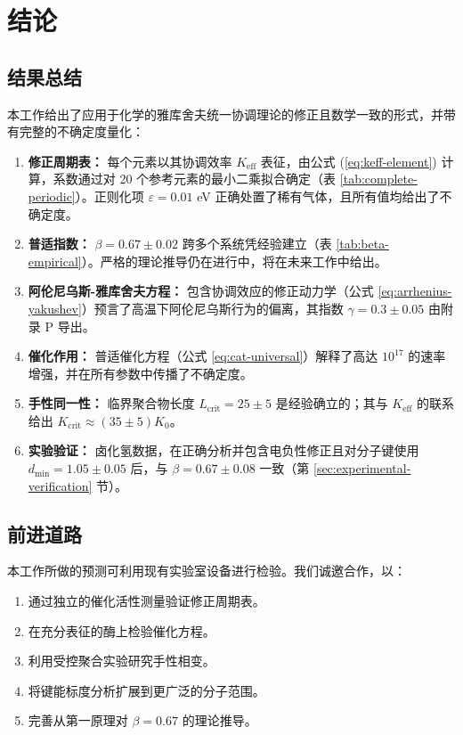 \documentclass[11pt,a4paper]{article}
\newcommand{\Keff}{K_{\mathrm{eff}}}
\newcommand{\Kcrit}{K_{\mathrm{crit}}}
\begin{document}
	\section{结论}
	\label{sec:conclusion}
	
	\subsection{结果总结}
	
	本工作给出了应用于化学的雅库舍夫统一协调理论的修正且数学一致的形式，并带有完整的不确定度量化：
	
	\begin{enumerate}
		\item \textbf{修正周期表：} 每个元素以其协调效率 \(\Keff\) 表征，由公式 (\ref{eq:keff-element}) 计算，系数通过对 20 个参考元素的最小二乘拟合确定（表 \ref{tab:complete-periodic}）。正则化项 \(\varepsilon = 0.01\) eV 正确处置了稀有气体，且所有值均给出了不确定度。
		
		\item \textbf{普适指数：} \(\beta = 0.67 \pm 0.02\) 跨多个系统凭经验建立（表 \ref{tab:beta-empirical}）。严格的理论推导仍在进行中，将在未来工作中给出。
		
		\item \textbf{阿伦尼乌斯-雅库舍夫方程：} 包含协调效应的修正动力学（公式 \ref{eq:arrhenius-yakushev}）预言了高温下阿伦尼乌斯行为的偏离，其指数 \(\gamma = 0.3 \pm 0.05\) 由附录 P 导出。
		
		\item \textbf{催化作用：} 普适催化方程（公式 \ref{eq:cat-universal}）解释了高达 \(10^{17}\) 的速率增强，并在所有参数中传播了不确定度。
		
		\item \textbf{手性同一性：} 临界聚合物长度 \(L_{\text{crit}} = 25 \pm 5\) 是经验确立的；其与 \(\Keff\) 的联系给出 \(\Kcrit \approx (35 \pm 5) K_0\)。
		
		\item \textbf{实验验证：} 卤化氢数据，在正确分析并包含电负性修正且对分子键使用 \(d_{\text{min}} = 1.05 \pm 0.05\) 后，与 \(\beta = 0.67 \pm 0.08\) 一致（第 \ref{sec:experimental-verification} 节）。
	\end{enumerate}
	
	\subsection{前进道路}
	
	本工作所做的预测可利用现有实验室设备进行检验。我们诚邀合作，以：
	\begin{enumerate}
		\item 通过独立的催化活性测量验证修正周期表。
		\item 在充分表征的酶上检验催化方程。
		\item 利用受控聚合实验研究手性相变。
		\item 将键能标度分析扩展到更广泛的分子范围。
		\item 完善从第一原理对 \(\beta = 0.67\) 的理论推导。
	\end{enumerate}
	
\end{document}
